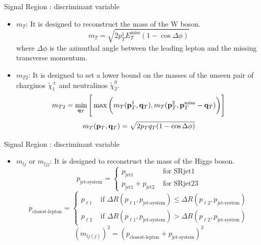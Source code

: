 \documentclass[mathserif,serif]{beamer}
\begin{document}
\begin{frame}{Signal Region : discriminant variable}
\begin{itemize}
\item $m_T$: It is designed to reconstruct the mass of the W boson.
\begin{equation*}
m_T = \sqrt{ 2 p_T^1 E_T^{\text{miss}} ( 1 - \cos{\Delta\phi} ) }
\end{equation*}
where $\Delta\phi$ is the azimuthal angle between the leading lepton and the missing transverse momentum.
\item $m_{T2}$: It is designed to set a lower bound on the masses of the unseen pair of charginos $\tilde{\chi}_1^\pm$ and neutralinos $\tilde{\chi}_2^0$.
\begin{equation*}
m_{T2} = \min_{{\bf q}_T} \Bigg[ \max \bigg( m_T( {\bf p}_T^1, {\bf q}_T ), m_T( {\bf p}_T^2, {\bf p}_T^{\text{miss}} - {\bf q}_T ) \bigg) \Bigg]
\end{equation*}
\begin{equation*}
m_T( {\bf p}_T, {\bf q}_T ) = \sqrt{ 2 p_T q_T ( 1 - \cos{\Delta\phi} ) }
\end{equation*}
\end{itemize}
\end{frame}

\begin{frame}{Signal Region : discriminant variable}
\begin{itemize}
\item $m_{lj}$ or $m_{ljj}$: It is designed to reconstruct the mass of the Higgs boson.
\begin{equation*}
p_{\text{jet-system}} =
\left\{
\begin{array}{ll}
p_{\text{jet1}} &\text{ for SRjet1}\\
p_{\text{jet1}} + p_{\text{jet2}} &\text{ for SRjet23}
\end{array} \right.
\end{equation*}
\begin{equation*}
p_{\text{closest-lepton}} =
\left\{
\begin{array}{ll}
p_{\ell 1} &\text{ if } \Delta R(p_{\ell 1},p_{\text{jet-system}}) \leq \Delta R(p_{\ell 2},p_{\text{jet-system}}) \\
p_{\ell 2} &\text{ if } \Delta R(p_{\ell 1},p_{\text{jet-system}}) > \Delta R(p_{\ell 2},p_{\text{jet-system}})
\end{array} \right.
\end{equation*}
\begin{equation*}
(m_{lj(j)})^2 = (p_{\text{closest-lepton}} + p_{\text{jet-system}})^2
\end{equation*}
\end{itemize}
\end{frame}
\end{document}
